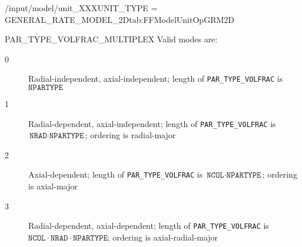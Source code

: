 \begin{condsubgroup}{/input/model/unit\_XXX}{UNIT\_TYPE = GENERAL\_RATE\_MODEL\_2D}{tab:FFModelUnitOpGRM2D}
\begin{dataset}[unit=--,type=int,range={$\{0, \dots, 3 \}$},length={1}]{PAR\_TYPE\_VOLFRAC\_MULTIPLEX}
    Valid modes are:
    \begin{description}
      \item[0] Radial-independent, axial-independent; length of \texttt{PAR\_TYPE\_VOLFRAC} is $\texttt{NPARTYPE}$
      \item[1] Radial-dependent, axial-independent; length of \texttt{PAR\_TYPE\_VOLFRAC} is $\texttt{NRAD} \cdot \texttt{NPARTYPE}$; ordering is radial-major
      \item[2] Axial-dependent; length of \texttt{PAR\_TYPE\_VOLFRAC} is $\texttt{NCOL} \cdot \texttt{NPARTYPE}$; ordering is axial-major
      \item[3] Radial-dependent, axial-dependent; length of \texttt{PAR\_TYPE\_VOLFRAC} is $\texttt{NCOL} \cdot \texttt{NRAD} \cdot \texttt{NPARTYPE}$; ordering is axial-radial-major
    \end{description}\vspace{-\baselineskip}
  \end{dataset}
\end{condsubgroup}

